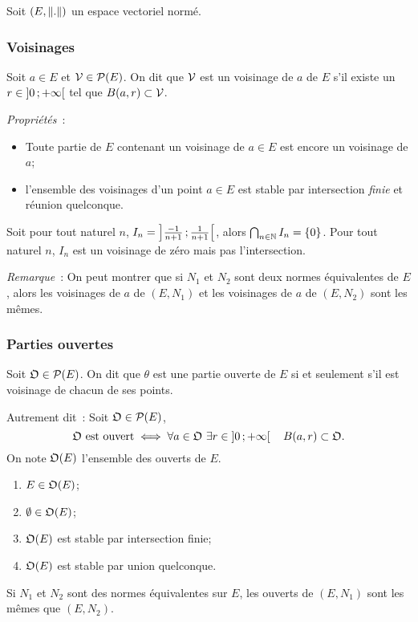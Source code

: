 Soit $(E, \left\lVert.\right\rVert)$ un espace vectoriel normé.

\subsubsection{Voisinages}

\begin{defdef}
  Soit $a \in E$ et $\mathcal{V} \in \mathcal{P}(E)$. On dit que $\mathcal{V}$ est un voisinage de $a$ de $E$ s'il existe un $r \in \left] 0 \, ;  +\infty \right[$ tel que $B(a, r) \subset \mathcal{V}$.
\end{defdef}

\emph{Propriétés}~:
\begin{itemize}
\item Toute partie de $E$ contenant un voisinage de $a \in E$ est encore un voisinage de $a$;
\item l'ensemble des voisinages d'un point $a \in E$ est stable par intersection \emph{finie} et réunion quelconque.
\end{itemize}

Soit pour tout naturel $n$, $I_n=\left] \frac{-1}{n+1} \, ;  \frac{1}{n+1} \right[$, alors $\bigcap_{n \in \mathbb{N}} I_n =\{0\}$. Pour tout naturel $n$, $I_n$ est un voisinage de zéro mais pas l'intersection.

\emph{Remarque}~: On peut montrer que si $N_1$ et $N_2$ sont deux normes équivalentes de $E$, alors les voisinages de $a$ de $(E, N_1)$ et les voisinages de $a$ de $(E, N_2)$ sont les mêmes.

\subsubsection{Parties ouvertes}

\begin{defdef}
 Soit $\mathfrak{O} \in \mathcal{P}(E)$. On dit que $\theta$ est une partie ouverte de $E$ si et seulement s'il est voisinage de chacun de ses points. 

  Autrement dit~: Soit $\mathfrak{O} \in \mathcal{P}(E)$,
  \begin{equation}
    \mathfrak{O} \text{~est ouvert} \iff \forall a \in \mathfrak{O} \ \exists r \in \left] 0 \, ;  +\infty \right[ \quad B(a, r) \subset \mathfrak{O}.
  \end{equation}
  On note $\mathfrak{O}(E)$ l'ensemble des ouverts de $E$.
\end{defdef}
\begin{prop}
  \begin{enumerate}
  \item $E \in \mathfrak{O}(E)$;
  \item $\emptyset \in \mathfrak{O}(E)$;
  \item $\mathfrak{O}(E)$ est stable par intersection finie;
  \item $\mathfrak{O}(E)$ est stable par union quelconque.
  \end{enumerate}
\end{prop}
%
\begin{prop}[Admise]
  Si $N_1$ et $N_2$ sont des normes équivalentes sur $E$, les ouverts de $(E, N_1)$ sont les mêmes que $(E, N_2)$.
\end{prop}

